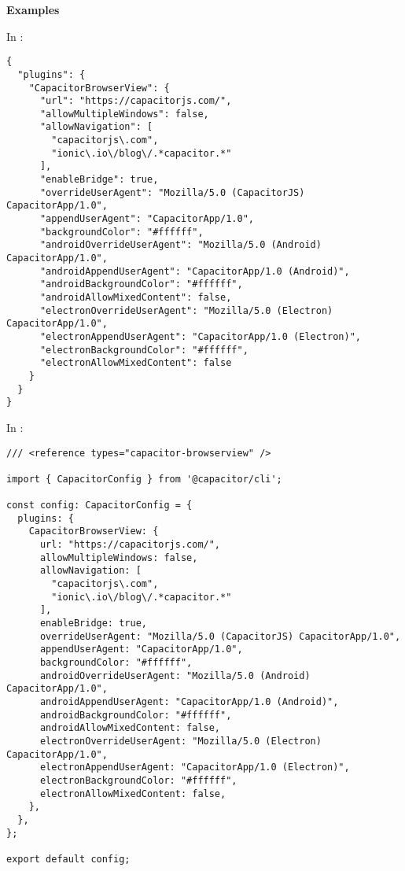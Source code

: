 \newpage

\textbf{Examples}

In :

\begin{verbatim}
{
  "plugins": {
    "CapacitorBrowserView": {
      "url": "https://capacitorjs.com/",
      "allowMultipleWindows": false,
      "allowNavigation": [
        "capacitorjs\.com",
        "ionic\.io\/blog\/.*capacitor.*"
      ],
      "enableBridge": true,
      "overrideUserAgent": "Mozilla/5.0 (CapacitorJS) CapacitorApp/1.0",
      "appendUserAgent": "CapacitorApp/1.0",
      "backgroundColor": "#ffffff",
      "androidOverrideUserAgent": "Mozilla/5.0 (Android) CapacitorApp/1.0",
      "androidAppendUserAgent": "CapacitorApp/1.0 (Android)",
      "androidBackgroundColor": "#ffffff",
      "androidAllowMixedContent": false,
      "electronOverrideUserAgent": "Mozilla/5.0 (Electron) CapacitorApp/1.0",
      "electronAppendUserAgent": "CapacitorApp/1.0 (Electron)",
      "electronBackgroundColor": "#ffffff",
      "electronAllowMixedContent": false
    }
  }
}
\end{verbatim}

In :

\begin{verbatim}
/// <reference types="capacitor-browserview" />

import { CapacitorConfig } from '@capacitor/cli';

const config: CapacitorConfig = {
  plugins: {
    CapacitorBrowserView: {
      url: "https://capacitorjs.com/",
      allowMultipleWindows: false,
      allowNavigation: [
        "capacitorjs\.com",
        "ionic\.io\/blog\/.*capacitor.*"
      ],
      enableBridge: true,
      overrideUserAgent: "Mozilla/5.0 (CapacitorJS) CapacitorApp/1.0",
      appendUserAgent: "CapacitorApp/1.0",
      backgroundColor: "#ffffff",
      androidOverrideUserAgent: "Mozilla/5.0 (Android) CapacitorApp/1.0",
      androidAppendUserAgent: "CapacitorApp/1.0 (Android)",
      androidBackgroundColor: "#ffffff",
      androidAllowMixedContent: false,
      electronOverrideUserAgent: "Mozilla/5.0 (Electron) CapacitorApp/1.0",
      electronAppendUserAgent: "CapacitorApp/1.0 (Electron)",
      electronBackgroundColor: "#ffffff",
      electronAllowMixedContent: false,
    },
  },
};

export default config;
\end{verbatim}

\printfn

